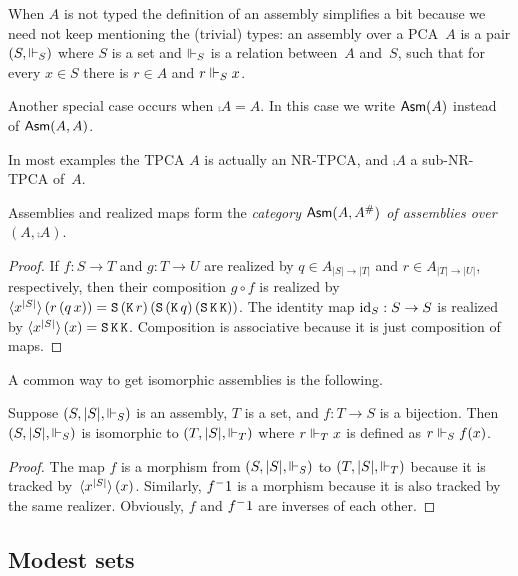 When $A$ is not typed the definition of an assembly simplifies a bit
because we need not keep mentioning the (trivial) types: an assembly
over a PCA~$A$ is a pair $(S, {\Vdash_S})$ where $S$ is a set and $\Vdash_S$
is a relation between~$A$ and~$S$, such that for every $x \in S$ there
is $r \in A$ and $r \Vdash_S x$.

Another special case occurs when $\comp{A} = A$. In this case we write
$\mathsf{Asm}(A)$ instead of $\mathsf{Asm}(A,A)$.

In most examples the TPCA $A$ is actually an NR-TPCA, and $\comp{A}$ a
sub-NR-TPCA of~$A$.

\begin{proposition}
  Assemblies and realized maps form the \emph{category
    $\mathsf{Asm}(A,A^{\#})$ of assemblies over $(A, \comp{A})$}.
\end{proposition}

\begin{proof}
  If $f : S \to T$ and $g : T \to U$ are realized by $q \in A_{|S| \to
    |T|}$ and $r \in A_{|T| \to |U|}$, respectively, then their
  composition $g \circ f$ is realized by
  $\langle x^{|S|} \rangle\,(r\,(q\,x)) =
  \mathtt{S}\,(\mathtt{K}\,r)\,(\mathtt{S}\,(\mathtt{K}\,q)\,(\mathtt{S}\,\mathtt{K}\,\mathtt{K}))$.
  The identity map $\mathrm{id}_S : S \to S$ is realized by
  $\langle x^{|S|} \rangle\,(x) = \mathtt{S}\,\mathtt{K}\,\mathtt{K}$. Composition
  is associative because it is just composition of maps.
\end{proof}

A common way to get isomorphic assemblies is the following.

\begin{lemma}
  \label{lemma:iso-assembly}
  Suppose $(S, |S|, {\Vdash_S})$ is an assembly, $T$ is a set, and $f : T
  \to S$ is a bijection. Then $(S, |S|, {\Vdash_S})$ is isomorphic to
  $(T, |S|, {\Vdash_T})$ where $r \Vdash_T x$ is defined as $r \Vdash_S f(x)$.
\end{lemma}

\begin{proof}
  The map $f$ is a morphism from $(S, |S|, {\Vdash_S})$ to $(T, |S|,
  {\Vdash_T})$ because it is tracked by~$\langle x^{|S|} \rangle\,(x)$.
  Similarly, ${f}^-1$ is a morphism because it is also tracked by the
  same realizer. Obviously, $f$ and ${f}^-1$ are inverses of each
  other.
\end{proof}


\subsection{Modest sets}
\label{sec:modest-sets}


